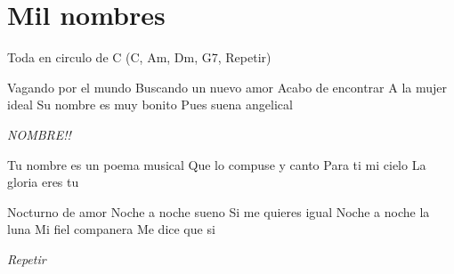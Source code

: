 \section{Mil nombres}

\noindent
\chordC
\chordAm
\chordDm
\chordGs

\vspace{1cm}

Toda en circulo de C (C, Am, Dm, G7, Repetir)

\begin{guitar}
	\begin{multicols}{2}
		Vagando por el mundo
		Buscando un nuevo amor
		Acabo de encontrar
		A la mujer ideal
		Su nombre es muy bonito
		Pues suena angelical


		\textit{NOMBRE!!}


		Tu nombre es un poema musical
		Que lo compuse y canto
		Para ti mi cielo
		La gloria eres tu


		Nocturno de amor
		Noche a noche sueno
		Si me quieres igual
		Noche a noche la luna
		Mi fiel companera
		Me dice que si
		
		\textit{Repetir}
	\end{multicols}
\end{guitar}
